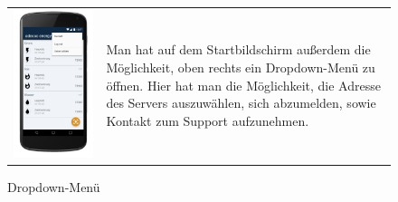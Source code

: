 \begin{figure}[h]
\begin{tabularx}{\textwidth}{X  X}
	\includegraphics[scale = 0.155]{img/AndroidMockup/dropdown} \caption{Dropdown-Menü} & Man hat auf dem Startbildschirm außerdem die Möglichkeit, oben rechts ein Dropdown-Menü zu öffnen. Hier hat man die Möglichkeit, die Adresse des Servers auszuwählen, sich abzumelden, sowie Kontakt zum Support aufzunehmen. \\

\end{tabularx}
\end{figure}
